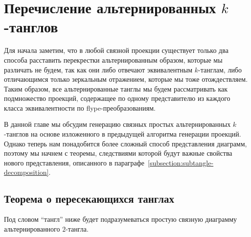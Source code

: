 \newpage
\section{Перечисление альтернированных $k$-танглов}
	\label{section:alternating}

	Для начала заметим, что в любой связной проекции существует только два способа расставить перекрестки альтернированным образом, которые
	мы различать не будем, так как они либо отвечают эквивалентным $k$-танглам, либо отличающимся только зеркальным отражением, которые мы
	тоже отождествляем. Таким образом, все альтернированные танглы мы будем рассматривать как подмножество проекций, содержащее по одному
	представителю из каждого класса эквивалентности по flype-преобразованиям.

	В данной главе мы обсудим генерацию связных простых альтернированных $k$-танглов на основе изложенного в предыдущей алгоритма генерации
	проекций. Однако теперь нам понадобится более сложный способ представления диаграмм, поэтому мы начнем с теоремы, следствиями которой
	будут важные свойства нового представления, описанного в параграфе~\ref{subsection:subtangle-decomposition}.

	\subsection{Теорема о пересекающихся танглах}

		Под словом ``тангл'' ниже будет подразумеваться простую связную диаграмму альтернированного $2$-тангла.


